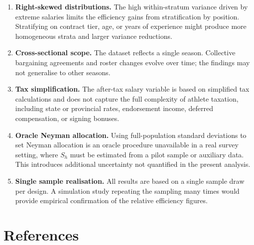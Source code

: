 \documentclass[12pt]{article}
\begin{document}
\begin{enumerate}
  \item \textbf{Right-skewed distributions.} The high within-stratum variance driven
        by extreme salaries limits the efficiency gains from stratification by position.
        Stratifying on contract tier, age, or years of experience might produce more
        homogeneous strata and larger variance reductions.

  \item \textbf{Cross-sectional scope.} The dataset reflects a single season.
        Collective bargaining agreements and roster changes evolve over time; the
        findings may not generalise to other seasons.

  \item \textbf{Tax simplification.} The after-tax salary variable is based on
        simplified tax calculations and does not capture the full complexity of athlete
        taxation, including state or provincial rates, endorsement income, deferred
        compensation, or signing bonuses.

  \item \textbf{Oracle Neyman allocation.} Using full-population standard deviations
        to set Neyman allocation is an oracle procedure unavailable in a real survey
        setting, where $S_h$ must be estimated from a pilot sample or auxiliary data.
        This introduces additional uncertainty not quantified in the present analysis.

  \item \textbf{Single sample realisation.} All results are based on a single sample
        draw per design. A simulation study repeating the sampling many times would
        provide empirical confirmation of the relative efficiency figures.
\end{enumerate}

\newpage

\section*{References}
\end{document}
